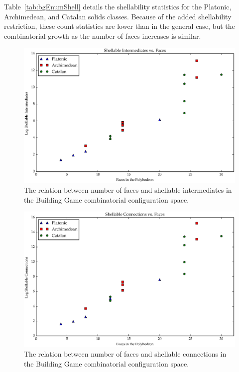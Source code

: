 Table~\ref{tab:bgEnumShell} details the shellability statistics for the Platonic, Archimedean, and Catalan solids classes. Because of the added shellability restriction, these count statistics are lower than in the general case, but the combinatorial growth as the number of faces increases is similar.  



\begin{figure}[ht]
\includegraphics[scale=0.6, angle=0]{images/polys_face_shell_int.eps}
\caption{The relation between number of faces and shellable intermediates in the Building Game combinatorial configuration space.}
\label{fig:FacIntShell}
\end{figure}

\begin{figure}[ht]
\includegraphics[scale=0.6, angle=0]{images/polys_face_shell_con.eps}
\caption{The relation between number of faces and shellable connections in the Building Game combinatorial configuration space.}
\label{fig:FacConShell}
\end{figure}

